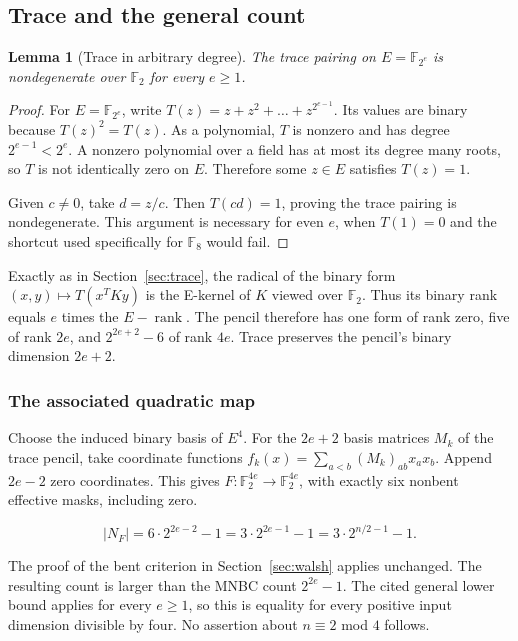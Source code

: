 \documentclass[11pt,a4paper]{article}
\newcommand{\F}{\mathbb F}
\newtheorem{lemma}[theorem]{Lemma}
\theoremstyle{definition}
\begin{document}
\subsection{Trace and the general count}

\begin{lemma}[Trace in arbitrary degree]\label{lem:generaltrace}The trace pairing on $E=\F_{2^e}$ is nondegenerate over $\F_2$ for every $e\ge1$.\end{lemma}\begin{proof}

For $E=\F_{2^{e}}$, write $T(z)=z+z^{2}+\ldots +z^{2^{e-1}}$. Its values are binary because $T(z)^{2}=T(z)$. As a polynomial, $T$ is nonzero and has degree $2^{e-1}<2^{e}$. A nonzero polynomial over a field has at most its degree many roots, so $T$ is not identically zero on $E$. Therefore some $z\in E$ satisfies $T(z)=1$.


Given $c\ne 0$, take $d=z/c$. Then $T(cd)=1$, proving the trace pairing is nondegenerate. This argument is necessary for even $e$, when $T(1)=0$ and the shortcut used specifically for $\F_{8}$ would fail.


\end{proof}

Exactly as in Section~\ref{sec:trace}, the radical of the binary form $(x,y)\mapsto T(x^{T}Ky)$ is the E-kernel of $K$ viewed over $\F_{2}$. Thus its binary rank equals $e$ times the $E-\operatorname{rank}$. The pencil therefore has one form of rank zero, five of rank $2e$, and $2^{2e+2}-6$ of rank $4e$. Trace preserves the pencil's binary dimension $2e+2$.


\subsubsection*{The associated quadratic map}

Choose the induced binary basis of $E^{4}$. For the $2e+2$ basis matrices $M_{k}$ of the trace pencil, take coordinate functions $f_{k}(x)=\sum _{a<b}(M_{k})_{ab}x_{a}x_{b}$. Append $2e-2$ zero coordinates. This gives $F:\F_{2}^{4e}\to \F_{2}^{4e}$, with exactly six nonbent effective masks, including zero.


\begin{equation}\label{eq:129}
|N_F|=6\cdot2^{2e-2}-1=3\cdot2^{2e-1}-1=3\cdot2^{n/2-1}-1.
\end{equation}

The proof of the bent criterion in Section~\ref{sec:walsh} applies unchanged. The resulting count is larger than the MNBC count $2^{2e}-1$. The cited general lower bound \cite{ref1} applies for every $e\ge 1$, so this is equality for every positive input dimension divisible by four. No assertion about $n\equiv 2$ mod $4$ follows.
\end{document}
